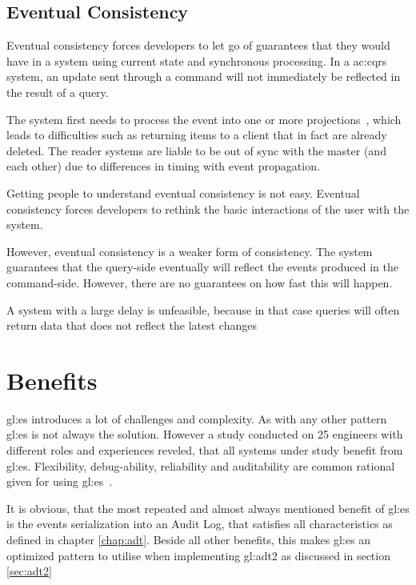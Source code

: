 \subsection{Eventual Consistency}

Eventual consistency forces developers to let go of guarantees that they would have in a system using current state and synchronous processing. In a \gls{ac:cqrs} system, an update sent through a command will not immediately be reflected in the result of a query. 

The system first needs to process the event into one or more projections~\citep{OVEREEM2021110970}, which leads to difficulties such as returning items to a client that in fact are already deleted. The reader systems are liable to be out of sync with the master (and each other) due to differences in timing with event propagation.

Getting people to understand eventual consistency is not easy. Eventual consistency forces developers to rethink the basic interactions of the user with the system. 

However, eventual consistency is a weaker form of consistency. The system guarantees that the query-side eventually will reflect the events produced in the command-side. However, there are no guarantees on how fast this will happen. 

A system with a large delay is unfeasible, because in that case queries will often return data that does not reflect the latest changes

\pagebreak

\section{Benefits}

\gls{gl:es} introduces a lot of challenges and complexity. As with any other pattern \gls{gl:es} is not always the solution. However a study conducted on 25 engineers with different roles and experiences reveled, that all systems under study benefit from \gls{gl:es}. Flexibility, debug-ability, reliability and auditability are common rational given for using \gls{gl:es}~\citep{OVEREEM2021110970}.

It is obvious, that the most repeated and almost always mentioned benefit of \gls{gl:es} is the events serialization into an Audit Log, that satisfies all characteristics as defined in chapter \ref{chap:adt}. Beside all other benefits, this makes \gls{gl:es} an optimized pattern to utilise when implementing \gls{gl:adt2} as discussed in section \ref{sec:adt2}

